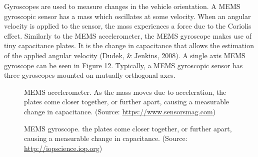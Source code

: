 \documentclass[a4paper]{article}
\begin{document}
Gyroscopes are used to measure changes in the vehicle orientation. A MEMS gyroscopic sensor has a mass which oscillates at some velocity. When an angular velocity is applied to the sensor, the mass experiences a force due to the Coriolis effect. Similarly to the MEMS accelerometer, the MEMS gyroscope makes use of tiny capacitance plates. It is the change in capacitance that allows the estimation of the applied angular velocity (Dudek, \& Jenkins, 2008). A single axis MEMS gyroscope can be seen in Figure 12. Typically, a MEMS gyroscopic sensor has three gyroscopes mounted on mutually orthogonal axes. 
\begin{figure}[h]
\hspace{0.5cm}
\begin{minipage}[t]{0.40\textwidth}
\centering
{}
\caption{MEMS accelerometer. As the mass moves due to acceleration, the plates come closer together, or further apart, causing a measurable change in capacitance. (Source: \protect\url{https://www.sensorsmag.com})}
\end{minipage}
\hspace{3cm}
\begin{minipage}[t]{0.3\textwidth}
\centering
{}
\caption{MEMS gyroscope. the plates come closer together, or further apart, causing a measurable change in capacitance. (Source: \protect\url{http://iopscience.iop.org})}
\end{minipage}
\end{figure}
\end{document}
